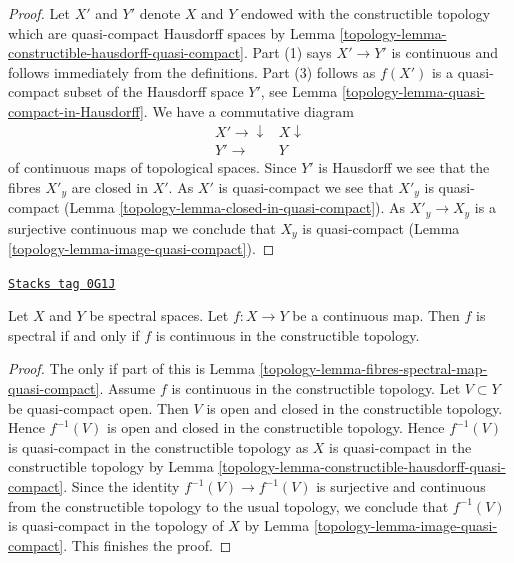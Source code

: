 \begin{proof}

Let $X'$ and $Y'$ denote $X$ and $Y$ endowed with the constructible topology
which are quasi-compact Hausdorff spaces by
Lemma \ref{topology-lemma-constructible-hausdorff-quasi-compact}.
Part (1) says $X' \to Y'$ is continuous and follows immediately from the
definitions. Part (3) follows as $f(X')$ is a quasi-compact subset of the
Hausdorff space $Y'$, see Lemma \ref{topology-lemma-quasi-compact-in-Hausdorff}.
We have a commutative diagram
$$
\begin{array}{cc}X' \longrightarrow\downarrow & X \downarrow \\ Y' \longrightarrow & Y\end{array}
$$
of continuous maps of topological spaces. Since $Y'$ is Hausdorff
we see that the fibres $X'_y$ are closed in $X'$. As $X'$ is quasi-compact
we see that $X'_y$ is quasi-compact
(Lemma \ref{topology-lemma-closed-in-quasi-compact}).
As $X'_y \to X_y$ is a surjective continuous map we conclude
that $X_y$ is quasi-compact (Lemma \ref{topology-lemma-image-quasi-compact}).
\end{proof}

\begin{lemma}
\label{topology-lemma-spectral-if-continuous-wrt-constructible-top}
\href{https://stacks.math.columbia.edu/tag/0G1J}{\texttt{Stacks tag 0G1J}}

Let $X$ and $Y$ be spectral spaces. Let $f : X \to Y$ be a continuous map.
Then $f$ is spectral if and only if $f$ is continuous in the constructible
topology.
\end{lemma}

\begin{proof}

The only if part of this is
Lemma \ref{topology-lemma-fibres-spectral-map-quasi-compact}.
Assume $f$ is continuous in the constructible topology.
Let $V \subset Y$ be quasi-compact open.
Then $V$ is open and closed in the constructible topology.
Hence $f^{-1}(V)$ is open and closed in the constructible topology.
Hence $f^{-1}(V)$ is quasi-compact in the constructible topology
as $X$ is quasi-compact in the constructible topology by
Lemma \ref{topology-lemma-constructible-hausdorff-quasi-compact}.
Since the identity $f^{-1}(V) \to f^{-1}(V)$ is surjective
and continuous from the constructible topology to the usual
topology, we conclude that $f^{-1}(V)$ is quasi-compact
in the topology of $X$ by Lemma \ref{topology-lemma-image-quasi-compact}.
This finishes the proof.
\end{proof}

